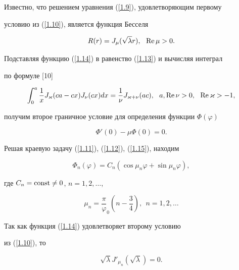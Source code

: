 Известно, что решением уравнения (\ref{1.9}), удовлетворяющим первому 


условию из (\ref{1.10}), является функция Бесселя


\begin{equation}


R(r)=J_\mu(\sqrt\lambda r),\ \ \re \mu> 0.\label{1.14}


\end{equation}





Подставляя функцию (\ref{1.14}) в равенство (\ref{1.13}) и вычисляя интеграл  


по формуле [10]


$$


\int_0^a \frac1x J_\varkappa(ca-cx)J_\nu(cx)dx=\frac1{\nu}J_{\varkappa+\nu}


(ac),\ \ a,\re \nu>0,\ \ \re\varkappa>-1,


$$


получим второе граничное условие для определения функции $\Phi(\varphi)$


\begin{equation}


\Phi'(0)-\mu \Phi(0)=0.\label{1.15}


\end{equation}





Решая краевую задачу (\ref{1.11}), (\ref{1.12}), (\ref{1.15}), находим


\begin{equation}


\Phi_n(\varphi)=C_n(\cos\mu_n\varphi+\sin\mu_n\varphi),\label{1.16}


\end{equation}


где $C_n=\operatorname{const}\ne 0$, $n=1,2,\dotsc$,


\begin{equation}


\mu_n=\frac\pi\varphi_0 \left(n-\frac34\right),\ \ n=1,2,\dotsc\label{11.16}


\end{equation}





Так как функция (\ref{1.14}) удовлетворяет второму условию


из (\ref{1.10}), то


\begin{equation}


\sqrt\lambda J'_{\mu_n}(\sqrt\lambda) =0.\label{1.17}


\end{equation}





